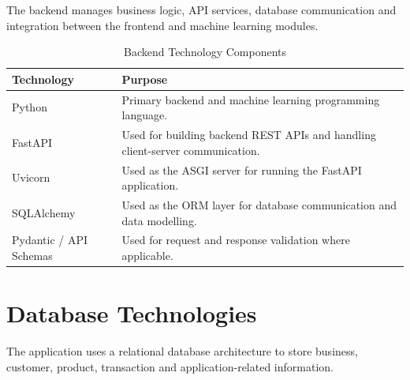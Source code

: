\documentclass[12pt,a4paper]{report}
\begin{document}
The backend manages business logic, API services, database communication
and integration between the frontend and machine learning modules.

\begin{table}[H]
\centering

\caption{Backend Technology Components}

\begin{tabular}{p{4cm} p{9cm}}

\toprule

\textbf{Technology} &
\textbf{Purpose}

\\

\midrule

Python &
Primary backend and machine learning programming language.

\\[6pt]

FastAPI &
Used for building backend REST APIs and handling client-server
communication.

\\[6pt]

Uvicorn &
Used as the ASGI server for running the FastAPI application.

\\[6pt]

SQLAlchemy &
Used as the ORM layer for database communication and data modelling.

\\[6pt]

Pydantic / API Schemas &
Used for request and response validation where applicable.

\\

\bottomrule

\end{tabular}

\end{table}



\section{Database Technologies}

The application uses a relational database architecture to store business,
customer, product, transaction and application-related information.
\end{document}
